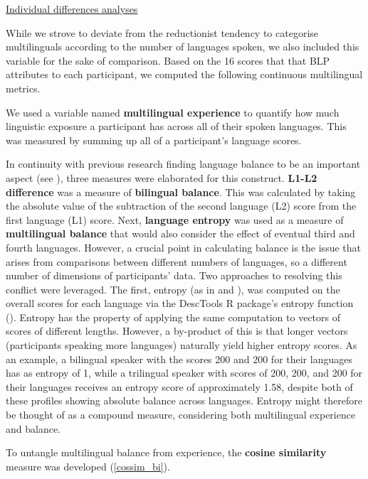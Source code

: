 \noindent \underline{Individual differences analyses}

\noindent
While we strove to deviate from the reductionist tendency to categorise multilinguals according to the number of languages spoken, we also included this variable for the sake of comparison. Based on the 16 scores that that BLP attributes to each participant, we computed the following continuous multilingual metrics.

We used a variable named \textbf{multilingual experience} to quantify how much linguistic exposure a participant has across all of their spoken languages. This was measured by summing up all of a participant's language scores.

In continuity with previous research finding language balance to be an important aspect (see \textcite{Gullifer2019}), three measures were elaborated for this construct. \textbf{L1-L2 difference} was a measure of \textbf{bilingual balance}. This was calculated by taking the absolute value of the subtraction of the second language (L2) score from the first language (L1) score. Next, \textbf{language entropy} was used as a measure of \textbf{multilingual balance} that would also consider the effect of eventual third and fourth languages. However, a crucial point in calculating balance is the issue that arises from comparisons between different numbers of languages, so a different number of dimensions of participants' data. Two approaches to resolving this conflict were leveraged. The first, entropy (as in \textcite{Gullifer2019} and \textcite{Onnis2018}), was computed on the overall scores for each language via the \textrm{DescTools} R package's \textrm{entropy} function (\cite{DescTools}). Entropy has the property of applying the same computation to vectors of scores of different lengths. However, a by-product of this is that longer vectors (participants speaking more languages) naturally yield higher entropy scores. As an example, a bilingual speaker with the scores 200 and 200 for their languages has as entropy of 1, while a trilingual speaker with scores of 200, 200, and 200 for their languages receives an entropy score of approximately 1.58, despite both of these profiles showing absolute balance across languages. Entropy might therefore be thought of as a compound measure, considering both multilingual experience and balance.

To untangle multilingual balance from experience, the \textbf{cosine similarity} measure was developed (\autoref{cossim_bi}).

